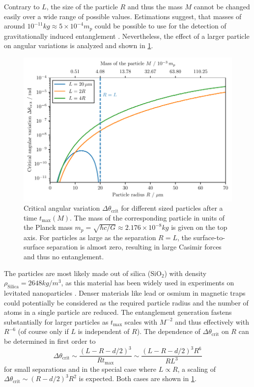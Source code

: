 Contrary to $L$, the size of the particle $R$ and thus the mass $M$ cannot be changed easily over a wide range of possible values.
Estimations suggest, that masses of around $10^{-11}\si{kg} \approx 5 \times 10^{-4}m_p$ could be possible to use for the detection of gravitationally induced entanglement \cite[Timestamp 51:00]{Aspelmeyer_2024}.
Nevertheless, the effect of a larger particle on angular variations is analyzed and shown in \cref{fig:4:theta-crit-mass}.
\begin{figure}[!htbp]
  \centering
  \includegraphics[width=\textwidth]{./../figures/theta-variance/theta-crit-mass.pdf}
  \caption{Critical angular variation $\Delta \theta_\mathrm{crit}$ for different sized particles after a time $t_\mathrm{max}(M)$. The mass of the corresponding particle in units of the Planck mass $m_p = \sqrt{\hbar c / G} \approx 2.176\times 10^{-8}\si{kg}$ is given on the top axis. For particles as large as the separation $R = L$, the surface-to-surface separation is almost zero, resulting in large Casimir forces and thus no entanglement.}
  \label{fig:4:theta-crit-mass}
\end{figure}
The particles are most likely made out of silica ($\mathrm{SiO_2}$) with density $\rho_\mathrm{Silica} = 2648\si{kg/m^3}$, as this material has been widely used in experiments on levitated nanoparticles \cite{Grass_2016,Slezak_2018}.
Denser materials like lead or osmium \cite{Krisnanda_2020} in magnetic traps could potentially be considered as the required particle radius and the number of atoms in a single particle are reduced.
The entanglement generation fastens substantially for larger particles as $t_\mathrm{max}$ scales with $M^{-2}$ and thus effectively with $R^{-6}$ (of course only if $L$ is independent of $R$).
The dependence of $\Delta \theta_\mathrm{crit}$ on $R$ can be determined in first order to
\begin{equation}
  \Delta \theta_\mathrm{crit} \sim \frac{(L - R - d/2)^3}{R t_\mathrm{max}} \sim \frac{(L - R - d/2)^3 R^6}{R L^3 }
\end{equation}
for small separations and in the special case where $L \propto R$, a scaling of $\Delta \theta_\mathrm{crit} \sim (R - d/2)^3 R^2$ is expected.
Both cases are shown in \cref{fig:4:theta-crit-mass}.

